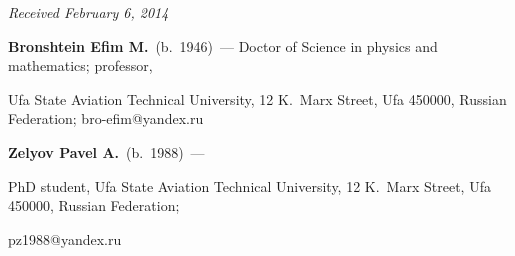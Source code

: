 \hfill{\small\textit{Received February 6, 2014}}





\vspace*{-18pt}





\Contr





\noindent


\textbf{Bronshtein Efim M.}\ (b.\ 1946)~--- Doctor of Science in physics and mathematics; professor,


Ufa State Aviation Technical University, 12 K.~Marx Street, Ufa 450000, Russian Federation; bro-efim@yandex.ru





\vspace*{3pt}





\noindent


\textbf{Zelyov Pavel A.}\ (b.\ 1988)~---


PhD student,  Ufa State Aviation Technical University, 12 K.~Marx Street, Ufa 450000, Russian Federation;


pz1988@yandex.ru


\label{end\stat}





\renewcommand{\bibname}{\protect\rm Литература}


		





